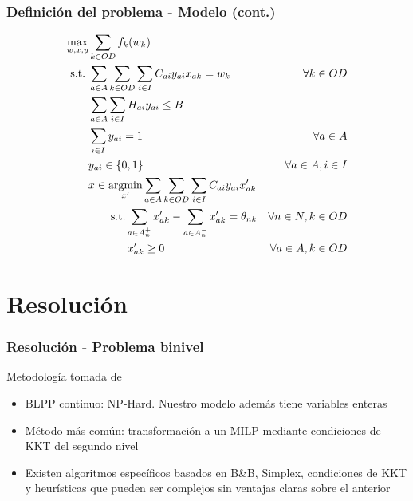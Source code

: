 \documentclass[aspectratio=43, 10pt]{beamer}
\newcommand{\argmin}{\mathop{\mathrm{argmin}}}
\newcommand{\modelspace}{\hspace{1.5em}}
\begin{document}
\begin{frame}
    \frametitle{Definición del problema - Modelo (cont.)}

    \begin{align}
      \max_{w,x,y}   & \sum_{k \in OD} f_k(w_k)                                                         & \label{eq:objective1lvl} \\
      \text{s.t.}\;  & \sum_{a \in A} \sum_{k \in OD} \sum_{i \in I} C_{ai}y_{ai}x_{ak} = w_k           & \forall k \in OD \label{eq:shortestpath} \\
                     & \sum_{a \in A} \sum_{i \in I} H_{ai}y_{ai} \leq B                                & \label{eq:respectbudget} \\
                     & \sum_{i \in I} y_{ai} = 1                                                        & \forall a \in A \label{eq:alwaysoney} \\
                     & y_{ai} \in \{0,1\}                                                               & \forall a \in A, i \in I \nonumber \\
                     & x \in \argmin_{x'} \sum_{a \in A} \sum_{k \in OD} \sum_{i \in I} C_{ai}y_{ai}x'_{ak}  & \label{eq:subproblem} \\
                     & \qquad \text{s.t.} \sum_{a \in A_n^+} x'_{ak} - \sum_{a \in A_n^-} x'_{ak} = \theta_{nk}   & \forall n \in N, k \in OD \label{eq:flowbalance} \\
                     & \qquad \modelspace x'_{ak} \geq 0                                                          & \forall a \in A, k \in OD \nonumber
    \end{align}
\end{frame}

\section{Resolución}

\begin{frame}
    \frametitle{Resolución - Problema binivel}

    Metodología tomada de \textcite{bardbook}

    \begin{itemize}
        \item{BLPP continuo: NP-Hard. Nuestro modelo además tiene variables enteras}
        \item{Método más común: transformación a un MILP mediante condiciones de KKT del segundo nivel}
        \item{Existen algoritmos específicos basados en B\&B, Simplex, condiciones de KKT y heurísticas que pueden ser complejos sin ventajas claras sobre el anterior}
    \end{itemize}
\end{frame}
\end{document}
